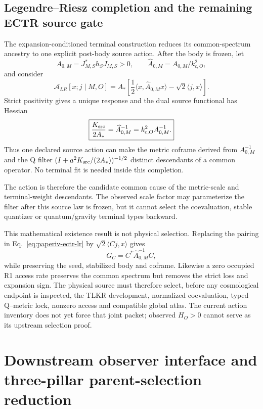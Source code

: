 \documentclass[11pt]{article}
\begin{document}
\subsection{Legendre--Riesz completion and the remaining ECTR source gate}

The expansion-conditioned terminal construction reduces its common-spectrum
ancestry to one explicit post-body source action. After the body is frozen,
let
\[
 A_{0,M}=J_{M,S}^*h_SJ_{M,S}>0,
 \qquad \widehat A_{0,M}=A_{0,M}/k_{c,O}^2,
\]
and consider
\begin{equation}
 \mathcal A_{LR}[x;j\mid M,O]
 =A_*\left[\frac{1}{2}\langle x,\widehat A_{0,M}x\rangle
 -\sqrt2\langle j,x\rangle\right].
 \label{eq:paperiv-ectr-lr}
\end{equation}
Strict positivity gives a unique response and the dual source functional has
Hessian
\begin{equation}
 \boxed{\frac{K_{\rm src}}{2A_*}
 =\widehat A_{0,M}^{-1}=k_{c,O}^2A_{0,M}^{-1}.}
 \label{eq:paperiv-ectr-lock}
\end{equation}
Thus one declared source action can make the metric coframe derived from
$A_{0,M}^{-1}$ and the Q filter $(I+a^2K_{\rm src}/(2A_*))^{-1/2}$ distinct
descendants of a common operator. No terminal fit is needed inside this
completion.

The action is therefore the candidate common cause of the metric-scale and
terminal-weight descendants.  The observed scale factor may parameterize the
filter after this source law is frozen, but it cannot select the coevaluation,
stable quantizer or quantum/gravity terminal types backward.

This mathematical existence result is not physical selection. Replacing the
pairing in Eq.~\eqref{eq:paperiv-ectr-lr} by
$\sqrt2\langle Cj,x\rangle$ gives
\begin{equation}
 G_C=C^*\widehat A_{0,M}^{-1}C,
 \label{eq:paperiv-ectr-counter}
\end{equation}
while preserving the seed, stabilized body and coframe. Likewise a zero
occupied R1 access rate preserves the common spectrum but removes the strict
loss and expansion sign. The physical source must therefore select, before
any cosmological endpoint is inspected, the TLKR development, normalized
coevaluation, typed Q--metric lock, nonzero access and compatible global
atlas. The current action inventory does not yet force that joint packet;
observed $H_O>0$ cannot serve as its upstream selection proof.


\section{Downstream observer interface and three-pillar parent-selection reduction}
\label{sec:paperiv-three-pillar-reduction}
\end{document}
